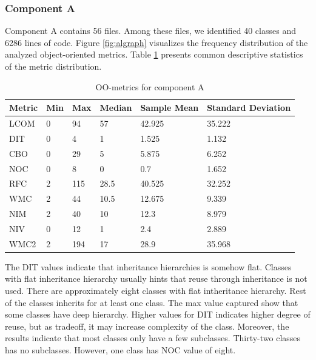 \subsubsection{Component A}
Component A contains 56 files. Among these files, we identified 40 classes and 6286 lines of code. Figure \ref{fig:algraph} visualizes the frequency distribution of the analyzed object-oriented metrics. Table \ref{tab:oometrics-al} presents common descriptive statistics of the metric distribution.

\begin{table}[]
\centering
\caption{OO-metrics for component A}
\label{tab:oometrics-al}
\begin{tabular}{|l|l|l|l|l|l|}
\hline
\textbf{Metric} & \textbf{Min} & \textbf{Max} & \textbf{Median} & \textbf{Sample Mean} & \textbf{Standard Deviation} \\ \hline
LCOM            & 0            & 94           & 57              & 42.925               & 35.222                      \\ \hline
DIT             & 0            & 4            & 1               & 1.525                & 1.132                       \\ \hline
CBO             & 0            & 29           & 5               & 5.875                & 6.252                       \\ \hline
NOC             & 0            & 8            & 0               & 0.7                  & 1.652                       \\ \hline
RFC             & 2            & 115          & 28.5            & 40.525               & 32.252                      \\ \hline
WMC             & 2            & 44           & 10.5            & 12.675               & 9.339                       \\ \hline
NIM             & 2            & 40           & 10              & 12.3                 & 8.979                       \\ \hline
NIV             & 0            & 12           & 1               & 2.4                  & 2.889                       \\ \hline
WMC2            & 2            & 194          & 17              & 28.9                 & 35.968                      \\ \hline
\end{tabular}
\end{table}

The DIT values indicate that inheritance hierarchies is somehow flat. Classes with flat inheritance hierarchy usually hints that reuse through inheritance is not used. There are approximately eight classes with flat intheritance hierarchy. Rest of the classes inherits for at least one class. The max value captured show that some classes have deep hierarchy. Higher values for DIT indicates higher degree of reuse, but as tradeoff, it may increase complexity of the class. Moreover, the results indicate that most classes only have a few subclasses. Thirty-two classes has no subclasses. However, one class has NOC value of eight. 

